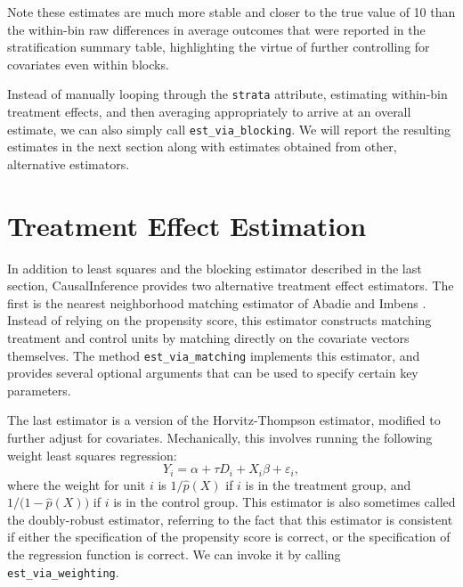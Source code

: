 \documentclass[12pt]{article}
\theoremstyle{definition}
\theoremstyle{definition}
\theoremstyle{definition}
\theoremstyle{remark}
\begin{document}
Note these estimates are much more stable and closer to the true value of 10 than the within-bin raw differences in average outcomes that were reported in the stratification summary table, highlighting the virtue of further controlling for covariates even within blocks.

Instead of manually looping through the \texttt{strata} attribute, estimating within-bin treatment effects, and then averaging appropriately to arrive at an overall estimate, we can also simply call \texttt{est\_via\_blocking}. We will report the resulting estimates in the next section along with estimates obtained from other, alternative estimators.

\section{Treatment Effect Estimation} \label{sec.f}

In addition to least squares and the blocking estimator described in the last section, CausalInference provides two alternative treatment effect estimators. The first is the nearest neighborhood matching estimator of Abadie and Imbens \citeyear{AbadieImbens.2006}. Instead of relying on the propensity score, this estimator constructs matching treatment and control units by matching directly on the covariate vectors themselves. The method \texttt{est\_via\_matching} implements this estimator, and provides several optional arguments that can be used to specify certain key parameters.

The last estimator is a version of the Horvitz-Thompson estimator, modified to further adjust for covariates. Mechanically, this involves running the following weight least squares regression:
\[Y_i = \alpha + \tau D_i + X_i \beta + \varepsilon_i,\]
where the weight for unit $i$ is $1/\hat{p}(X)$ if $i$ is in the treatment group, and $1/\big(1-\hat{p}(X)\big)$ if $i$ is in the control group. This estimator is also sometimes called the doubly-robust estimator, referring to the fact that this estimator is consistent if either the specification of the propensity score is correct, or the specification of the regression function is correct. We can invoke it by calling \texttt{est\_via\_weighting}.
\end{document}
